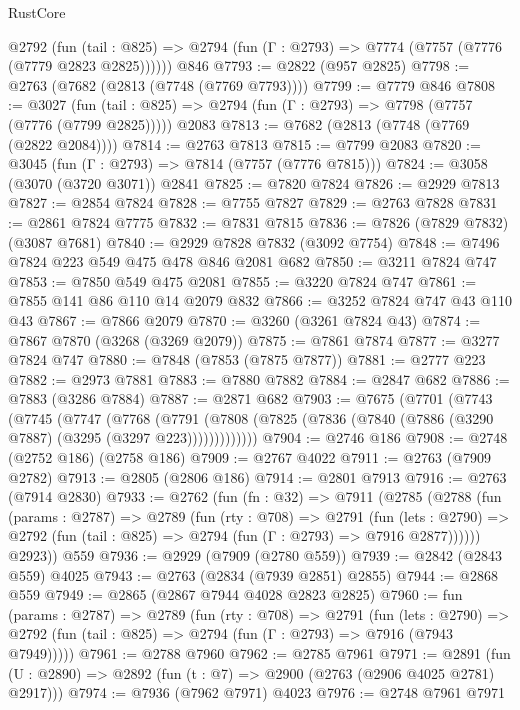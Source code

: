 \begin{lexlean}{RustCore}
\begin{coremodule}
    @2792
      (fun (tail : @825) => @2794 (fun (Γ : @2793) => @7774 (@7757 (@7776 (@7779 @2823 @2825))))))
    @846
@7793 := @2822 (@957 @2825)
@7798 := @2763 (@7682 (@2813 (@7748 (@7769 @7793))))
@7799 := @7779 @846
@7808 := @3027
    (fun (tail : @825) => @2794 (fun (Γ : @2793) => @7798 (@7757 (@7776 (@7799 @2825)))))
    @2083
@7813 := @7682 (@2813 (@7748 (@7769 (@2822 @2084))))
@7814 := @2763 @7813
@7815 := @7799 @2083
@7820 := @3045 (fun (Γ : @2793) => @7814 (@7757 (@7776 @7815)))
@7824 := @3058 (@3070 (@3720 @3071)) @2841
@7825 := @7820 @7824
@7826 := @2929 @7813
@7827 := @2854 @7824
@7828 := @7755 @7827
@7829 := @2763 @7828
@7831 := @2861 @7824 @7775
@7832 := @7831 @7815
@7836 := @7826 (@7829 @7832) (@3087 @7681)
@7840 := @2929 @7828 @7832 (@3092 @7754)
@7848 := @7496 @7824 @223 @549 @475 @478 @846 @2081 @682
@7850 := @3211 @7824 @747
@7853 := @7850 @549 @475 @2081
@7855 := @3220 @7824 @747
@7861 := @7855 @141 @86 @110 @14 @2079 @832
@7866 := @3252 @7824 @747 @43 @110 @43
@7867 := @7866 @2079
@7870 := @3260 (@3261 @7824 @43)
@7874 := @7867 @7870 (@3268 (@3269 @2079))
@7875 := @7861 @7874
@7877 := @3277 @7824 @747
@7880 := @7848 (@7853 (@7875 @7877))
@7881 := @2777 @223
@7882 := @2973 @7881
@7883 := @7880 @7882
@7884 := @2847 @682
@7886 := @7883 (@3286 @7884)
@7887 := @2871 @682
@7903 := @7675
    (@7701
      (@7743
        (@7745
          (@7747
            (@7768
              (@7791
                (@7808 (@7825 (@7836 (@7840 (@7886 (@3290 @7887) (@3295 (@3297 @223)))))))))))))
@7904 := @2746 @186
@7908 := @2748 (@2752 @186) (@2758 @186)
@7909 := @2767 @4022
@7911 := @2763 (@7909 @2782)
@7913 := @2805 (@2806 @186)
@7914 := @2801 @7913
@7916 := @2763 (@7914 @2830)
@7933 := @2762
    (fun (fn : @32) =>
    @7911
      (@2785
        (@2788
          (fun (params : @2787) =>
          @2789
            (fun (rty : @708) =>
            @2791
              (fun (lets : @2790) =>
              @2792 (fun (tail : @825) => @2794 (fun (Γ : @2793) => @7916 @2877))))))
        @2923))
    @559
@7936 := @2929 (@7909 (@2780 @559))
@7939 := @2842 (@2843 @559) @4025
@7943 := @2763 (@2834 (@7939 @2851) @2855)
@7944 := @2868 @559
@7949 := @2865 (@2867 @7944 @4028 @2823 @2825)
@7960 := fun (params : @2787) =>
  @2789
    (fun (rty : @708) =>
    @2791
      (fun (lets : @2790) =>
      @2792 (fun (tail : @825) => @2794 (fun (Γ : @2793) => @7916 (@7943 @7949)))))
@7961 := @2788 @7960
@7962 := @2785 @7961
@7971 := @2891 (fun (U : @2890) => @2892 (fun (t : @7) => @2900 (@2763 (@2906 @4025 @2781) @2917)))
@7974 := @7936 (@7962 @7971) @4023
@7976 := @2748 @7961 @7971

\end{coremodule}
\end{lexlean}
